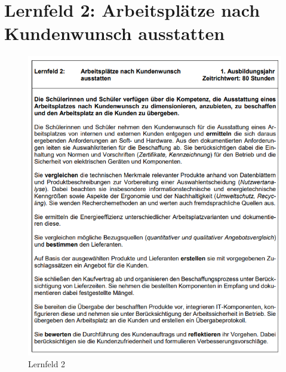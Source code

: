 \section{Lernfeld 2: Arbeitsplätze nach Kundenwunsch ausstatten}

\begin{figure}
    [H]
    \centering
    \includegraphics[width=\textwidth]{figures/lernfeld2.png}
    \caption{Lernfeld 2}
    \label{fig:lernfeld2}
\end{figure}





